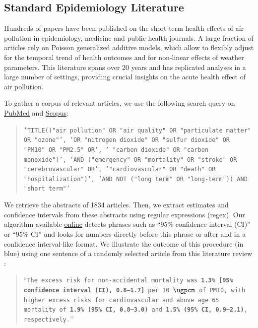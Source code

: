 \documentclass[12pt]{article}
\begin{document}
    \subsection{Standard Epidemiology Literature}
    
        Hundreds of papers have been published on the short-term health effects of air pollution in epidemiology, medicine and public health journals. A large fraction of articles rely on Poisson generalized additive models, which allow to flexibly adjust for the temporal trend of health outcomes and for non-linear effects of weather parameters. This literature spans over 20 years and has replicated analyses in a large number of settings, providing crucial insights on the acute health effect of air pollution. 
    
        To gather a corpus of relevant articles, we use the following search query on \href{https://www.ncbi.nlm.nih.gov/}{PubMed} and \href{https://www.scopus.com/home.uri}{Scopus}:
               
        \begin{quote}
       \footnotesize\texttt{'TITLE(("air pollution" OR "air quality" OR "particulate matter" OR "ozone"', 'OR "nitrogen dioxide" OR "sulfur dioxide" OR "PM10" OR "PM2.5" OR', ' "carbon dioxide" OR "carbon monoxide")',  'AND ("emergency" OR "mortality" OR "stroke" OR "cerebrovascular" OR', '"cardiovascular" OR "death" OR "hospitalization")', 'AND NOT ("long term" OR "long-term")) AND "short term"'}
        \end{quote}

       \noindent We retrieve the abstracts of 1834 articles. Then, we extract estimates and confidence intervals from these abstracts using regular expressions (regex). Our algorithm available \href{https://vincentbagilet.github.io/inference_pollution/automatic_lit_review_getting_abstracts.html}{online} detects phrases such as “95\% confidence interval (CI)” or “95\% CI” and looks for numbers directly before this phrase or after and in a confidence interval-like format. We illustrate the outcome of this procedure (in blue) using one sentence of a randomly selected article from this literature review \citep{vichit-vadakan_public_2008}:
        
\begin{sloppypar}
        \begin{quote}
         \footnotesize    “\texttt{The excess risk for non-accidental mortality was \textbf{\color{cerulean}1.3\% [95\% confidence interval (CI), 0.8–1.7]} per 10 $\si{\ugpcm}$ of PM10, with higher excess risks for cardiovascular and above age 65 mortality of \textbf{\color{cerulean}1.9\% (95\% CI, 0.8–3.0)} and \textbf{\color{cerulean}1.5\% (95\% CI, 0.9–2.1)}, respectively.}”
        \end{quote}
\end{sloppypar}
\end{document}
